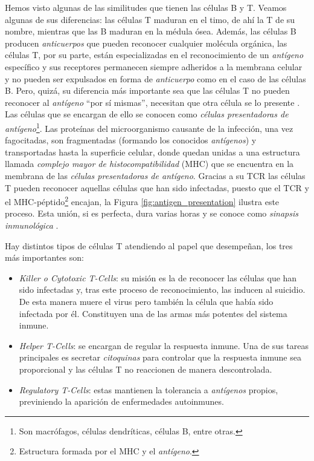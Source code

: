 Hemos visto algunas de las similitudes que tienen las células B y T. Veamos algunas de sus diferencias: las células T maduran en el timo, de ahí la T de su nombre, mientras que las B maduran en la médula ósea. Además, las células B producen \textit{anticuerpos} que pueden reconocer cualquier molécula orgánica, las células T, por su parte, están especializadas en el reconocimiento de un \textit{antígeno} específico y sus receptores permanecen siempre adheridos a la membrana celular y no pueden ser expulsados en forma de \textit{anticuerpo} como en el caso de las células B. Pero, quizá, su diferencia más importante sea que las células T no pueden reconocer al \textit{antígeno} ``por sí mismas'', necesitan que otra célula se lo presente \citep{theHowItWorks}. Las células que se encargan de ello se conocen como \textit{células presentadoras de antígeno}\footnote{Son macrófagos, células dendríticas, células B, entre otras.}. Las proteínas del microorganismo causante de la infección, una vez fagocitadas, son fragmentadas (formando los conocidos \textit{antígenos}) y transportadas hasta la superficie celular, donde quedan unidas a una estructura llamada \textit{complejo mayor de histocompatibilidad} (MHC) que se encuentra en la membrana de las \textit{células presentadoras de antígeno}. Gracias a su TCR las células T pueden reconocer aquellas células que han sido infectadas, puesto que el TCR y el MHC-péptido\footnote{Estructura formada por el MHC y el \textit{antígeno}.} encajan, la Figura \ref{fig:antigen_presentation} ilustra este proceso. Esta unión, si es perfecta, dura varias horas y se conoce como \textit{sinapsis inmunológica} \citep{fernandez2012mecanica}.



Hay distintos tipos de células T atendiendo al papel que desempeñan, los tres más importantes son: 
\begin{itemize}
	\item \textit{Killer o Cytotoxic T-Cells}: su misión es la de reconocer las células que han sido infectadas y, tras este proceso de reconocimiento, las inducen al suicidio. De esta manera muere el virus pero también la célula que había sido infectada por él. Constituyen una de las armas más potentes del sistema inmune.
	
	\item \textit{Helper T-Cells}: se encargan de regular la respuesta inmune. Una de sus tareas principales es secretar \textit{citoquinas} para controlar que la respuesta inmune sea proporcional y las células T no reaccionen de manera descontrolada.
	
	\item \textit{Regulatory T-Cells}: estas mantienen la tolerancia a \textit{antígenos} propios, previniendo la aparición de enfermedades autoinmunes.
\end{itemize}



